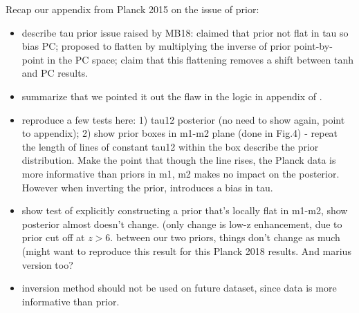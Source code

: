 \documentclass[prd,twocolumn,amsmath,amssymb,floatfix,superscriptaddress,nofootinbib]{revtex4-1}
\begin{document}
Recap our appendix from Planck 2015 on the issue of prior:
\begin{itemize}
    \item {describe tau prior issue raised by MB18: claimed that prior not flat in tau so bias PC; proposed to flatten by multiplying the inverse of prior point-by-point in the PC space; claim that this flattening removes a shift between tanh and PC results. }
    \item {summarize that we pointed it out the flaw in the logic in appendix of \cite{Heinrich:2018btc}.}
    \item{reproduce a few tests here: 1) tau12 posterior (no need to show again, point to appendix); 2) show prior boxes in m1-m2 plane (done in Fig.4) - repeat the length of lines of constant tau12 within the box describe the prior distribution. Make the point that though the line rises, the Planck data is more informative than priors in m1, m2 makes no impact on the posterior. However when inverting the prior, introduces a bias in tau.}
    \item{show test of explicitly constructing a prior that's locally flat in m1-m2, show posterior almost doesn't change. (only change is low-z enhancement, due to prior cut off at $z>6$. between our two priors, things don't change as much (might want to reproduce this result for this Planck 2018 results. And marius version too?}
    \item{inversion method should not be used on future dataset, since data is more informative than prior.}
\end{itemize}
\end{document}
